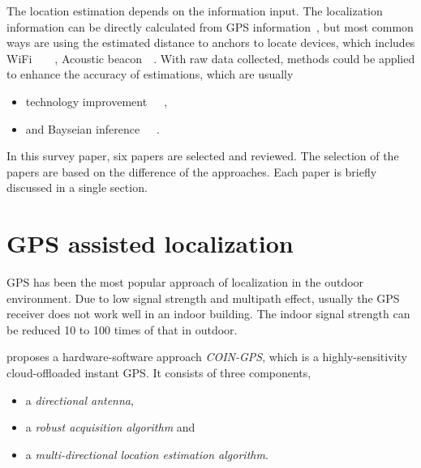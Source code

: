 \documentclass[letterpaper]{article}
\begin{document}
The location estimation depends on the information input.
The localization information can be directly calculated from GPS information~\cite{Nirjon:2014:CIL:2594368.2594378}, but most common ways are using the estimated distance to anchors to locate devices, which includes WiFi~\cite{Sen:2013:AMR:2462456.2464463}~\cite{Wang:2012:NNW:2307636.2307655}~\cite{Rai:2012:ZZC:2348543.2348580}~\cite{Nandakumar:2012:CLD:2348543.2348579}, Acoustic beacon~\cite{Liu:2013:GEF:2462456.2464450}~\cite{Nandakumar:2012:CLD:2348543.2348579}.
With raw data collected, methods could be applied to enhance the accuracy of estimations, which are usually
\begin{itemize}
	\item technology improvement~\cite{Nirjon:2014:CIL:2594368.2594378}~\cite{Sen:2013:AMR:2462456.2464463}~\cite{Liu:2013:GEF:2462456.2464450}, 
	\item and Bayseian inference~\cite{Wang:2012:NNW:2307636.2307655}~\cite{Nandakumar:2012:CLD:2348543.2348579}~\cite{Rai:2012:ZZC:2348543.2348580}.
\end{itemize}

In this survey paper, six papers are selected and reviewed.
The selection of the papers are based on the difference of the approaches.
Each paper is briefly discussed in a single section.

\section{GPS assisted localization}
\label{sec:gps_local}

GPS has been the most popular approach of localization in the outdoor environment.
Due to low signal strength and multipath effect, usually the GPS receiver does not work well in an indoor building.
The indoor signal strength can be reduced 10 to 100 times of that in outdoor.

\cite{Nirjon:2014:CIL:2594368.2594378} proposes a hardware-software approach \emph{COIN-GPS}, which is a highly-sensitivity cloud-offloaded instant GPS.
It consists of three components,
\begin{itemize}
	\item a \emph{directional antenna},
	\item a \emph{robust acquisition algorithm} and
	\item a \emph{multi-directional location estimation algorithm}.
\end{itemize}
\end{document}
